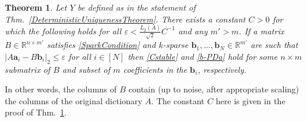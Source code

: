 \documentclass[journal, twocolumn]{IEEEtran}
\newtheorem{theorem}{Theorem}
\begin{document}
\begin{theorem}\label{DeterministicUniquenessTheorem2}
Let $Y$ be defined as in the statement of Thm.~\ref{DeterministicUniquenessTheorem}. There exists a constant $C > 0$ for which the following holds for all $\varepsilon < \frac{L_2(A)}{\sqrt{2}}C^{-1}$ and any $m' > m$. If a matrix $B \in \mathbb{R}^{n \times m'}$ satisfies \eqref{SparkCondition} and $k$-sparse $\mathbf{b}_1, \ldots, \mathbf{b}_N \in \mathbb{R}^{m'}$ are such that \mbox{$|A\mathbf{a}_i - B\mathbf{b}_i|_2 \leq \varepsilon$} for all $i \in [N]$ then \eqref{Cstable} and \eqref{b-PDa} hold for some $n \times m$ submatrix of $B$ and subset of $m$ coefficients in the $\mathbf{b}_i$, respectively. 
\end{theorem}

In other words, the columns of $B$ contain (up to noise, after appropriate scaling) the columns of the original dictionary $A$. 
The constant $C$ here is given in the proof of Thm.~\ref{DeterministicUniquenessTheorem2}. 


\vspace{-.08 cm}
\end{document}

